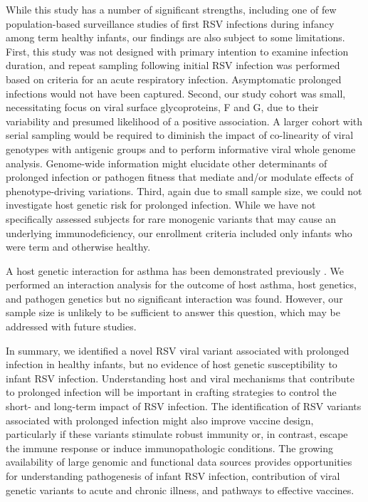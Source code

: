 \documentclass{article} %
\begin{document}
While this study has a number of significant strengths, including one of few population-based surveillance studies of first RSV infections during infancy among term healthy infants, our findings are also subject to some limitations. First, this study was not designed with primary intention to examine infection duration, and repeat sampling following initial RSV infection was performed based on criteria for an acute respiratory infection. Asymptomatic prolonged infections would not have been captured. Second, our study cohort was small, necessitating focus on viral surface glycoproteins, F and G, due to their variability and presumed likelihood of a positive association. A larger cohort with serial sampling would be required to diminish the impact of co-linearity of viral genotypes with antigenic groups and to perform informative viral whole genome analysis. Genome-wide information might elucidate other determinants of prolonged infection or pathogen fitness that mediate and/or modulate effects of phenotype-driving variations. Third, again due to small sample size, we could not investigate host genetic risk for prolonged infection. While we have not specifically assessed subjects for rare monogenic variants that may cause an underlying immunodeficiency, our enrollment criteria included only infants who were term and otherwise healthy. 

A host genetic interaction for asthma has been demonstrated previously 
\citep{moffatt2010large}.
We performed an interaction analysis for the outcome of host asthma, host genetics, and pathogen genetics 
but no significant interaction was found. 
However, our sample size is unlikely to be sufficient to answer this question, 
which may be addressed with future studies. 

In summary, we identified a novel RSV viral variant associated with prolonged infection in healthy infants, but no evidence of host genetic susceptibility to infant RSV infection. Understanding host and viral mechanisms that contribute to prolonged infection will be important in crafting strategies to control the short- and long-term impact of RSV infection. The identification of RSV variants associated with prolonged infection might also improve vaccine design, particularly if these variants stimulate robust immunity or, in contrast, escape the immune response or induce immunopathologic conditions. The growing availability of large genomic and functional data sources provides opportunities for understanding pathogenesis of infant RSV infection, contribution of viral genetic variants to acute and chronic illness, and pathways to effective vaccines.
\end{document}
